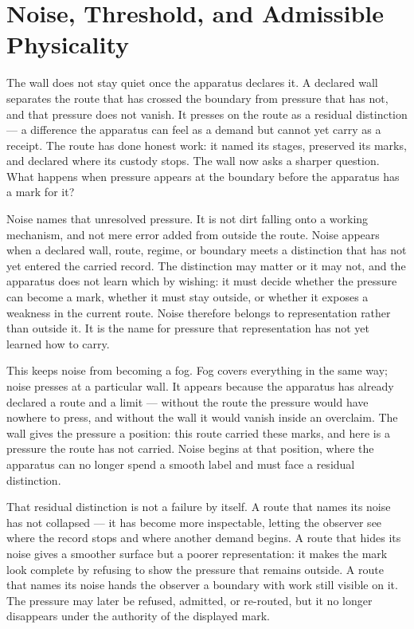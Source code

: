 \section{Noise, Threshold, and Admissible Physicality}

The wall does not stay quiet once the apparatus declares it. A declared wall separates the route that has crossed the boundary from pressure that has not, and that pressure does not vanish. It presses on the route as a residual distinction --- a difference the apparatus can feel as a demand but cannot yet carry as a receipt. The route has done honest work: it named its stages, preserved its marks, and declared where its custody stops. The wall now asks a sharper question. What happens when pressure appears at the boundary before the apparatus has a mark for it?

Noise names that unresolved pressure. It is not dirt falling onto a working mechanism, and not mere error added from outside the route. Noise appears when a declared wall, route, regime, or boundary meets a distinction that has not yet entered the carried record. The distinction may matter or it may not, and the apparatus does not learn which by wishing: it must decide whether the pressure can become a mark, whether it must stay outside, or whether it exposes a weakness in the current route. Noise therefore belongs to representation rather than outside it. It is the name for pressure that representation has not yet learned how to carry.

This keeps noise from becoming a fog. Fog covers everything in the same way; noise presses at a particular wall. It appears because the apparatus has already declared a route and a limit --- without the route the pressure would have nowhere to press, and without the wall it would vanish inside an overclaim. The wall gives the pressure a position: this route carried these marks, and here is a pressure the route has not carried. Noise begins at that position, where the apparatus can no longer spend a smooth label and must face a residual distinction.

That residual distinction is not a failure by itself. A route that names its noise has not collapsed --- it has become more inspectable, letting the observer see where the record stops and where another demand begins. A route that hides its noise gives a smoother surface but a poorer representation: it makes the mark look complete by refusing to show the pressure that remains outside. A route that names its noise hands the observer a boundary with work still visible on it. The pressure may later be refused, admitted, or re-routed, but it no longer disappears under the authority of the displayed mark.

